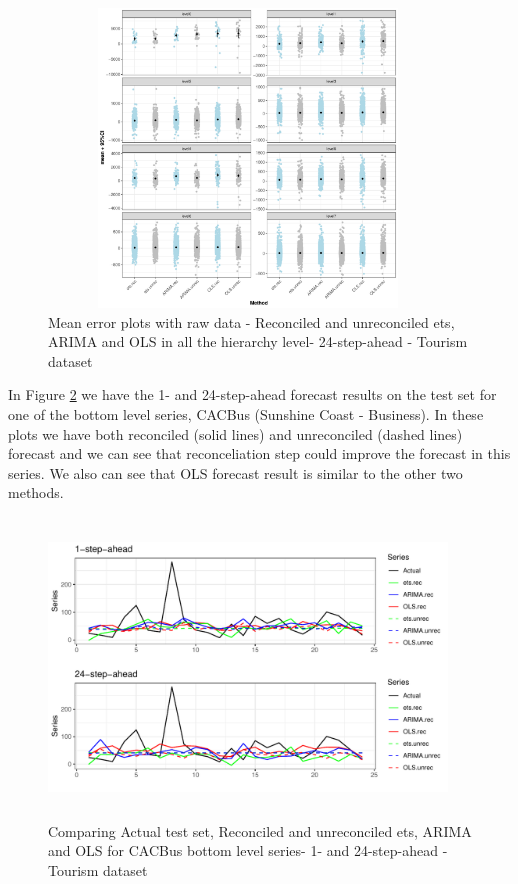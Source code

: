 \documentclass[11pt,a4paper,]{article}
\begin{document}
\begin{figure}

{\centering \includegraphics[width=400px,height=300px]{Paper-Figures/results_Tourism/boxplot_raw_data} 

}

\caption{Mean error plots with raw data -  Reconciled and unreconciled ets, ARIMA and OLS in all the hierarchy level- 24-step-ahead - Tourism dataset}\label{fig:errorplot24tourism}
\end{figure}

In Figure \ref{fig:forecstrolling24tourism} we have the 1- and
24-step-ahead forecast results on the test set for one of the bottom
level series, CACBus (Sunshine Coast - Business). In these plots we have
both reconciled (solid lines) and unreconciled (dashed lines) forecast
and we can see that reconceliation step could improve the forecast in
this series. We also can see that OLS forecast result is similar to the
other two methods.

\begin{figure}

{\centering \includegraphics[width=400px,height=300px]{hcf_files/figure-latex/forecstrolling24tourism-1} 

}

\caption{Comparing Actual test set, Reconciled and unreconciled ets, ARIMA and OLS for CACBus bottom level series- 1- and  24-step-ahead - Tourism dataset}\label{fig:forecstrolling24tourism}
\end{figure}
\end{document}
